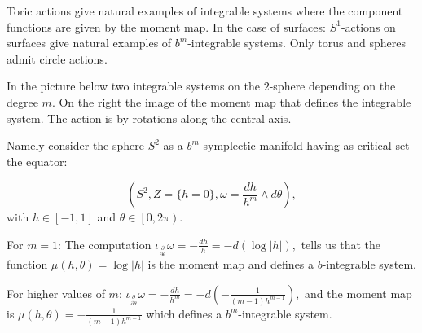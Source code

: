 \begin{example} Toric actions give natural examples of integrable systems where the component functions are given by the moment map. In the case of surfaces:
    $S^1$-actions on surfaces give natural examples of $b^m$-integrable systems. Only torus and spheres admit circle actions. 
    
    In the picture below two integrable systems on the $2$-sphere depending on the degree $m$. On the right the image of the moment map that defines the integrable system. The action is by rotations along the central axis.

    Namely consider the sphere $S^2$ as a  $b^m$-symplectic manifold having as critical set the equator:
        
        \[(S^2, Z = \{h = 0\}, \omega=\frac{d h}{h^m}\wedge d\theta),\] with $h\in\left[-1,1\right]$ and $\theta\in\left[0,2\pi\right)$.

For $m=1$: The computation $\iota_{\frac{\partial}{\partial \theta}}\omega=- \frac{d h}{h}=-d( \log |h|),$ tells us that the function $\mu(h,\theta)= \log |h|$ is the moment map and defines a $b$-integrable system.

For higher values of $m$: $\iota_{\frac{\partial}{\partial \theta}}\omega=- \frac{d h}{h^m}=-d(-\frac{1}{(m-1)h^{m-1}}),$ and the  moment map is $\mu(h,\theta)= -\frac{1}{(m-1)h^{m-1}}$ which defines a $b^m$-integrable system.
    
 \begin{figure}[h!]
\end{figure}
\end{example}
